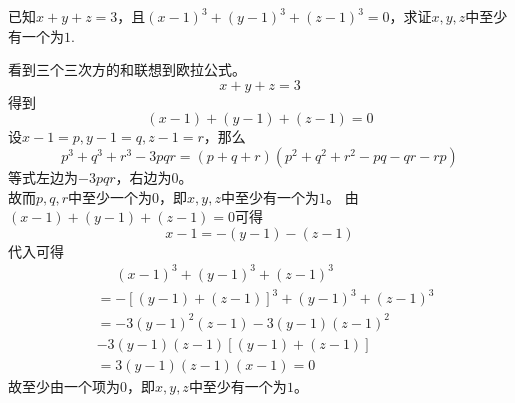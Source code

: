 \documentclass[windows,csize4,answers]{BHCexam}
\begin{document}
\begin{groups}
\begin{questions}[]
\begin{solution}{0.5cm}
        \end{solution}
        \vspace{3.5cm}

        \question[5]  已知$x+y+z=3$，且$(x-1)^3+(y-1)^3+(z-1)^3=0$，求证$x,y,z$中至少有一个为$1$.
        \begin{solution}{0.5cm}
            \method 看到三个三次方的和联想到欧拉公式。
            \begin{equation}
                x+y+z=3
            \end{equation}
            得到
            \begin{equation}
                (x-1)+(y-1)+(z-1)=0
            \end{equation}
            设$x-1=p,y-1=q,z-1=r$，那么
            \begin{equation}
                \label{eq:6_1}
                p^3+q^3+r^3-3pqr=(p+q+r)(p^2+q^2+r^2-pq-qr-rp)
            \end{equation}
            等式左边为$-3pqr$，右边为$0$。 \\ 
            故而$p,q,r$中至少一个为$0$，即$x,y,z$中至少有一个为$1$。
            \method 由$(x-1)+(y-1)+(z-1)=0$可得
            \[
                x-1=-(y-1)-(z-1)    
            \]
            代入可得
            \[
                \begin{aligned}
                    &\phantom{=}(x-1)^3+(y-1)^3+(z-1)^3 \\ 
                    &=-[(y-1)+(z-1)]^3+(y-1)^3+(z-1)^3 \\ 
                    & = -3(y-1)^2(z-1)-3(y-1)(z-1)^2 \\ 
                    &-3(y-1)(z-1)[(y-1)+(z-1)] \\ 
                    &=3(y-1)(z-1)(x-1) =0
                \end{aligned}
            \]
            故至少由一个项为$0$，即$x,y,z$中至少有一个为$1$。
        \end{solution}
        \vspace{3.5cm}


\end{questions}
\end{groups}
\end{document}
